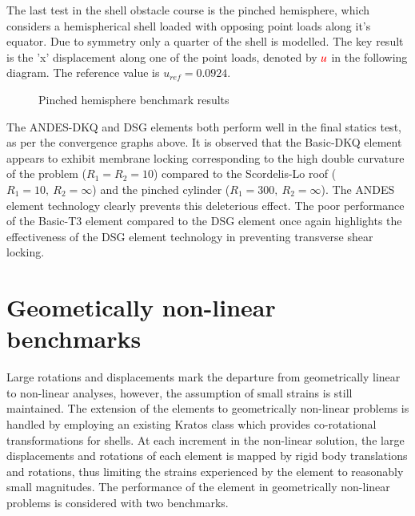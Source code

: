 The last test in the shell obstacle course is the pinched hemisphere, which considers a hemispherical shell loaded with opposing point loads along it's equator. Due to symmetry only a quarter of the shell is modelled. The key result is the 'x' displacement along one of the point loads, denoted by $\textcolor{red}{u}$ in the following diagram. The reference value is $u_{ref} =  0.0924$. 

\begin{figure}[H]
	\caption{\label{ref_label_overall}Pinched hemisphere benchmark results}
\end{figure}

The ANDES-DKQ and DSG elements both perform well in the final statics test, as per the convergence graphs above. It is observed that the Basic-DKQ element appears to exhibit membrane locking corresponding to the high double curvature of the problem ($R_1=R_2 = 10$) compared to the Scordelis-Lo roof ($R_1= 10,\ R_2 = \infty$) and the pinched cylinder ($R_1= 300,\ R_2 = \infty$). The ANDES element technology clearly prevents this deleterious effect. The poor performance of the Basic-T3 element compared to the DSG element once again highlights the effectiveness of the DSG element technology in preventing transverse shear locking.

\section{Geometically non-linear benchmarks}

Large rotations and displacements mark the departure from geometrically linear to non-linear analyses, however, the assumption of small strains is still maintained. The extension of the elements to geometrically non-linear problems is handled by employing an existing Kratos class which provides co-rotational transformations for shells. At each increment in the non-linear solution, the large displacements and rotations of each element is mapped by rigid body translations and rotations, thus limiting the strains experienced by the element to reasonably small magnitudes. The performance of the element in geometrically non-linear problems is considered with two benchmarks.


